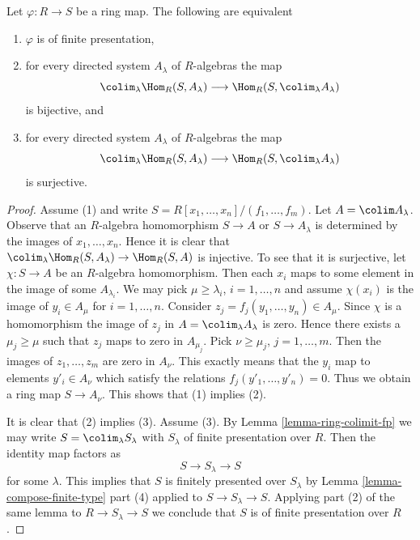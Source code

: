 \begin{lemma}
\label{lemma-characterize-finite-presentation}
Let $\varphi : R \to S$ be a ring map. The following are equivalent
\begin{enumerate}
\item $\varphi$ is of finite presentation,
\item for every directed system $A_\lambda$ of $R$-algebras
the map
$$
\colim_\lambda \Hom_R(S, A_\lambda) \longrightarrow
\Hom_R(S, \colim_\lambda A_\lambda)
$$
is bijective, and
\item for every directed system $A_\lambda$ of $R$-algebras
the map
$$
\colim_\lambda \Hom_R(S, A_\lambda) \longrightarrow
\Hom_R(S, \colim_\lambda A_\lambda)
$$
is surjective.
\end{enumerate}
\end{lemma}

\begin{proof}
Assume (1) and write $S = R[x_1, \ldots, x_n] / (f_1, \ldots, f_m)$.
Let $A = \colim A_\lambda$. Observe that an $R$-algebra homomorphism
$S \to A$ or $S \to A_\lambda$ is determined by the images of
$x_1, \ldots, x_n$. Hence it is clear that
$\colim_\lambda \Hom_R(S, A_\lambda) \to \Hom_R(S, A)$
is injective. To see that it is surjective, let $\chi : S \to A$
be an $R$-algebra homomorphism. Then each
$x_i$ maps to some element in the image of some $A_{\lambda_i}$.
We may pick $\mu \geq \lambda_i$, $i = 1, \ldots, n$ and
assume $\chi(x_i)$ is the image of $y_i \in A_\mu$ for
$i = 1, \ldots, n$. Consider $z_j = f_j(y_1, \ldots, y_n) \in A_\mu$.
Since $\chi$ is a homomorphism the image of $z_j$ in
$A = \colim_\lambda A_\lambda$ is zero. Hence there exists a
$\mu_j \geq \mu$ such that $z_j$ maps to zero in $A_{\mu_j}$.
Pick $\nu \geq \mu_j$, $j = 1, \ldots, m$. Then the
images of $z_1, \ldots, z_m$ are zero in $A_\nu$. This
exactly means that the $y_i$ map to elements
$y'_i \in A_\nu$ which satisfy the relations $f_j(y'_1, \ldots, y'_n) = 0$.
Thus we obtain a ring map $S \to A_\nu$. This shows that
(1) implies (2).

\medskip\noindent
It is clear that (2) implies (3). Assume (3).
By Lemma \ref{lemma-ring-colimit-fp} we may write
$S = \colim_\lambda S_\lambda$ with $S_\lambda$
of finite presentation over $R$. Then the identity map
factors as
$$
S \to S_\lambda \to S
$$
for some $\lambda$. This implies that $S$
is finitely presented over $S_\lambda$ by
Lemma \ref{lemma-compose-finite-type} part (4)
applied to $S \to S_\lambda \to S$. Applying part (2) of the same
lemma to $R \to S_\lambda \to S$ we conclude that $S$ is of finite
presentation over $R$.
\end{proof}
